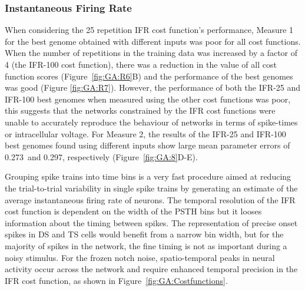\subsubsection{Instantaneous Firing Rate }\label{sec:GA:inst-firing-rate-summ}

 When
considering the 25 repetition IFR cost function's performance, Measure 1
for the best genome obtained with different inputs was poor for all cost
functions. When the number of repetitions in the training data was
increased by a factor of 4 (the IFR-100 cost function), there was a
reduction in the value of all cost function scores
(Figure~\ref{fig:GA:R6}B) and the performance of the best genomes was good
(Figure \ref{fig:GA:R7}). However, the performance of both the IFR-25 and
IFR-100 best genomes when measured using the other cost functions was poor,
this suggests that the networks constrained by the IFR cost functions were
unable to accurately reproduce the behaviour of networks in terms of
spike-times or intracellular
voltage. %
For Measure 2, the results of the IFR-25 and IFR-100 best genomes found using
different inputs show large mean parameter errors of 0.273~and 0.297,
respectively (Figure~\ref{fig:GA:8}D-E).

\smallskip{}

Grouping spike trains into time bins is a very fast procedure aimed at
reducing the trial-to-trial variability in single spike trains by
generating an estimate of the average instantaneous firing rate of
neurons. The temporal resolution of the IFR cost function is dependent on
the width of the PSTH bins but it looses information about the timing
between spikes.  The representation of precise onset spikes in DS and TS
cells would benefit from a narrow bin width, but for the majority of spikes
in the network, the fine timing is not as important during a noisy
stimulus.  For the frozen notch noise, spatio-temporal peaks in neural
activity occur across the network and require enhanced temporal precision
in the IFR cost function, as shown in Figure~\ref{fig:GA:Costfunctions}.

